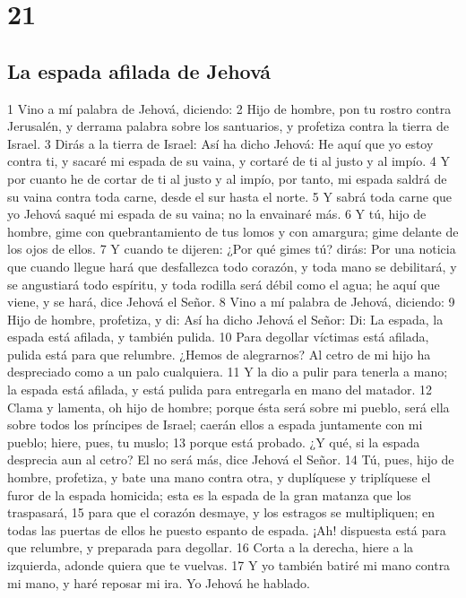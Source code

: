 \chapter{21}

\section*{La espada afilada de Jehová}

1 Vino a mí palabra de Jehová, diciendo:
2 Hijo de hombre, pon tu rostro contra Jerusalén, y derrama palabra sobre los santuarios, y profetiza contra la tierra de Israel.
3 Dirás a la tierra de Israel: Así ha dicho Jehová: He aquí que yo estoy contra ti, y sacaré mi espada de su vaina, y cortaré de ti al justo y al impío.
4 Y por cuanto he de cortar de ti al justo y al impío, por tanto, mi espada saldrá de su vaina contra toda carne, desde el sur hasta el norte.
5 Y sabrá toda carne que yo Jehová saqué mi espada de su vaina; no la envainaré más.
6 Y tú, hijo de hombre, gime con quebrantamiento de tus lomos y con amargura; gime delante de los ojos de ellos.
7 Y cuando te dijeren: ¿Por qué gimes tú? dirás: Por una noticia que cuando llegue hará que desfallezca todo corazón, y toda mano se debilitará, y se angustiará todo espíritu, y toda rodilla será débil como el agua; he aquí que viene, y se hará, dice Jehová el Señor.
8 Vino a mí palabra de Jehová, diciendo:
9 Hijo de hombre, profetiza, y di: Así ha dicho Jehová el Señor: Di: La espada, la espada está afilada, y también pulida.
10 Para degollar víctimas está afilada, pulida está para que relumbre. ¿Hemos de alegrarnos? Al cetro de mi hijo ha despreciado como a un palo cualquiera.
11 Y la dio a pulir para tenerla a mano; la espada está afilada, y está pulida para entregarla en mano del matador.
12 Clama y lamenta, oh hijo de hombre; porque ésta será sobre mi pueblo, será ella sobre todos los príncipes de Israel; caerán ellos a espada juntamente con mi pueblo; hiere, pues, tu muslo;
13 porque está probado. ¿Y qué, si la espada desprecia aun al cetro? El no será más, dice Jehová el Señor.
14 Tú, pues, hijo de hombre, profetiza, y bate una mano contra otra, y duplíquese y triplíquese el furor de la espada homicida; esta es la espada de la gran matanza que los traspasará,
15 para que el corazón desmaye, y los estragos se multipliquen; en todas las puertas de ellos he puesto espanto de espada. ¡Ah! dispuesta está para que relumbre, y preparada para degollar.
16 Corta a la derecha, hiere a la izquierda, adonde quiera que te vuelvas.
17 Y yo también batiré mi mano contra mi mano, y haré reposar mi ira. Yo Jehová he hablado.
